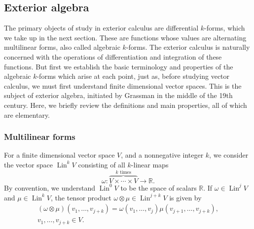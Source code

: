 \subsection{{Exterior algebra}}\label{sec:exterior-algebra}

{The primary objects of study in exterior calculus are differential $k$-forms, which we take up in the next section. These are functions whose values are alternating multilinear forms, also called algebraic $k$-forms. The exterior calculus is naturally concerned with the operations of differentiation and integration of these functions. But first we establish the basic terminology and properties of the algebraic $k$-forms which arise at each point, just as, before studying vector calculus, we must first understand finite dimensional vector spaces. This is the subject of exterior algebra, initiated by Grassman in the middle of the 19th century. Here, we briefly review the definitions and main properties, all of which are elementary.}

\subsubsection{{Multilinear forms}}\label{subsec:multilinear-forms}

{For a finite dimensional vector space $V$, and a nonnegative integer $k$, we consider the vector space $\operatorname{Lin}^kV$ consisting of all $k$-linear maps}
\[
\omega:\overbrace{V\times\cdots\times V}^{k\text{ times}}\to\mathbb R.
\]
{By convention, we understand $\operatorname{Lin}^0V$ to be the space of scalars $\mathbb R$. If $\omega\in\operatorname{Lin}^jV$ and $\mu\in\operatorname{Lin}^kV$, the tensor product $\omega\otimes\mu\in\operatorname{Lin}^{j+k}V$ is given by}
\[
\begin{gathered}
(\omega\otimes\mu)(v_1,\ldots,v_{j+k})=\omega(v_1,\ldots,v_j)\mu(v_{j+1},\ldots,v_{j+k}),\\
v_1,\ldots,v_{j+k}\in V.
\end{gathered}
\]

